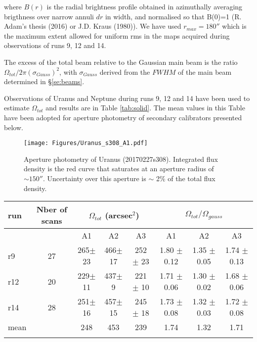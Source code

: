 \noindent where $B(r)$ is the radial brightness profile obtained in azimuthally averaging brigthness over narrow annuli
$dr$ in width, and normalised so that B(0)=1 (R. Adam's thesis (2016) or J.D. Kraus (1980)).
We have used $r_{max}=180''$ which is the maximum extent allowed for uniform rms in the maps acquired during observations of runs 9, 12 and 14.

The excess of the total beam relative to the Gaussian main beam is the ratio
$\Omega_{tot} / 2 \pi (\sigma_{Gauss})^2$, with  $\sigma_{Gauss}$ derived from the $FWHM$ of the main beam determined
in \S \ref{se:beams}.

Observations of Uranus and Neptune during runs 9, 12 and 14 have been used to estimate $\Omega_{tot}$ and results
are in Table \ref{tab:solid}. The mean values in this Table have been adopted for aperture photometry of secondary calibrators presented below.  



\begin{figure}[ht!]
  \begin{center}
    \texttt{[image: Figures/Uranus\_s308\_A1.pdf]}
    \caption{Aperture photometry of Uranus (20170227s308). Integrated flux density is the red curve that
saturates at an aperture radius of $ \sim 150''$. Uncertainty over this aperture is $\sim$ 2\% of the total flux density.}
    \label{fig:Uranus_s308}
  \end{center}
\end{figure}


\begin{table*}[!h]
\caption{Solid angle of total beam based on Uranus and Neptune observations}
\label{tab:solid}
\centering
\begin{tabular}{l| c | c c c | c c c}
\hline\hline
\noalign{\smallskip}
run  & Nber of scans & \multicolumn{3}{c}{$\Omega_{tot}$ (arcsec$^{2}$)} & \multicolumn{3}{c}{$\Omega_{tot}/\Omega_{gauss}$} \\
\hline
     &               &  A1    &    A2   &  A3  & A1  &  A2  & A3   \\
            \hline
r9    & 27  &  265$\pm$ 23    &  466$\pm$ 17 & 252 $\pm$ 23 &  1.80 $\pm$ 0.12    &  1.35 $\pm$ 0.05   &   1.74 $\pm$ 0.13   \\
r12   & 20  &  229$\pm$ 11    &  437$\pm$  9 & 221 $\pm$ 10 &  1.71 $\pm$ 0.06   &  1.30 $\pm$ 0.02   &   1.68 $\pm$ 0.06   \\
r14   & 28  &  251$\pm$ 16    &  457$\pm$ 15 & 245 $\pm$ 18 &  1.73 $\pm$ 0.08   &  1.32 $\pm$ 0.03   &   1.72 $\pm$ 0.08   \\
mean  &     &  248            &  453         &  239         &  1.74              &   1.32             &   1.71              \\
       \noalign{\smallskip}
            \hline
\end{tabular}
\end{table*}


